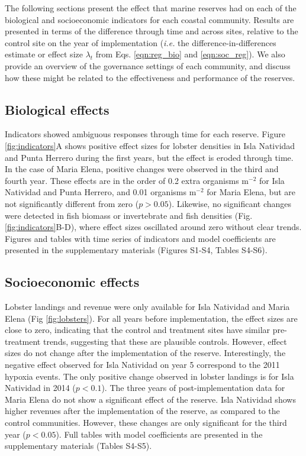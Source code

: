\documentclass{frontiersSCNS}
\begin{document}
The following sections present the effect that marine reserves had on
each of the biological and socioeconomic indicators for each coastal
community. Results are presented in terms of the difference through time
and across sites, relative to the control site on the year of
implementation (\emph{i.e.} the difference-in-differences estimate or
effect size \(\lambda_t\) from Eqs. \ref{eqn:reg_bio} and
\ref{eqn:soc_reg}). We also provide an overview of the governance
settings of each community, and discuss how these might be related to
the effectiveness and performance of the reserves.

\hypertarget{biological-effects}{%
\subsection{Biological effects}\label{biological-effects}}

Indicators showed ambiguous responses through time for each reserve.
Figure \ref{fig:indicators}A shows positive effect sizes for lobster
densities in Isla Natividad and Punta Herrero during the first years,
but the effect is eroded through time. In the case of Maria Elena,
positive changes were observed in the third and fourth year. These
effects are in the order of 0.2 extra organisms \(\mathrm{m}^{-2}\) for
Isla Natividad and Punta Herrero, and 0.01 organisms \(\mathrm{m}^{-2}\)
for Maria Elena, but are not significantly different from zero
(\(p > 0.05\)). Likewise, no significant changes were detected in fish
biomass or invertebrate and fish densities (Fig.
\ref{fig:indicators}B-D), where effect sizes oscillated around zero
without clear trends. Figures and tables with time series of indicators
and model coefficients are presented in the supplementary materials
(Figures S1-S4, Tables S4-S6).

\hypertarget{socioeconomic-effects}{%
\subsection{Socioeconomic effects}\label{socioeconomic-effects}}

Lobster landings and revenue were only available for Isla Natividad and
Maria Elena (Fig \ref{fig:lobsters}). For all years before
implementation, the effect sizes are close to zero, indicating that the
control and treatment sites have similar pre-treatment trends,
suggesting that these are plausible controls. However, effect sizes do
not change after the implementation of the reserve. Interestingly, the
negative effect observed for Isla Natividad on year 5 correspond to the
2011 hypoxia events. The only positive change observed in lobster
landings is for Isla Natividad in 2014 (\(p < 0.1\)). The three years of
post-implementation data for Maria Elena do not show a significant
effect of the reserve. Isla Natividad shows higher revenues after the
implementation of the reserve, as compared to the control communities.
However, these changes are only significant for the third year
(\(p < 0.05\)). Full tables with model coefficients are presented in the
supplementary materials (Tables S4-S5).
\end{document}
